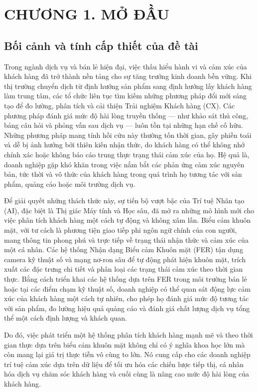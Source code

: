 \section*{CHƯƠNG 1. MỞ ĐẦU}
\setcounter{section}{1}
\setcounter{subsection}{0}
\setcounter{figure}{0}
\setcounter{table}{0}

\subsection{Bối cảnh và tính cấp thiết của đề tài}
Trong ngành dịch vụ và bán lẻ hiện đại, việc thấu hiểu hành vi và cảm xúc của khách hàng đã trở thành nền tảng cho sự tăng trưởng kinh doanh bền vững. Khi thị trường chuyển dịch từ định hướng sản phẩm sang định hướng lấy khách hàng làm trung tâm, các tổ chức liên tục tìm kiếm những phương pháp đổi mới sáng tạo để đo lường, phân tích và cải thiện Trải nghiệm Khách hàng (CX). Các phương pháp đánh giá mức độ hài lòng truyền thống — như khảo sát thủ công, bảng câu hỏi và phỏng vấn sau dịch vụ — luôn tồn tại những hạn chế cố hữu. Những phương pháp mang tính hồi cứu này thường tốn thời gian, gây phiền toái và dễ bị ảnh hưởng bởi thiên kiến nhận thức, do khách hàng có thể không nhớ chính xác hoặc không báo cáo trung thực trạng thái cảm xúc của họ. Hệ quả là, doanh nghiệp gặp khó khăn trong việc nắm bắt các phản ứng cảm xúc nguyên bản, tức thời và vô thức của khách hàng trong quá trình họ tương tác với sản phẩm, quảng cáo hoặc môi trường dịch vụ.

Để giải quyết những thách thức này, sự tiến bộ vượt bậc của Trí tuệ Nhân tạo (AI), đặc biệt là Thị giác Máy tính và Học sâu, đã mở ra những mô hình mới cho việc phân tích khách hàng một cách tự động và không xâm lấn. Biểu cảm khuôn mặt, với tư cách là phương tiện giao tiếp phi ngôn ngữ chính của con người, mang thông tin phong phú và trực tiếp về trạng thái nhận thức và cảm xúc của một cá nhân. Các hệ thống Nhận dạng Biểu cảm Khuôn mặt (FER) tận dụng camera kỹ thuật số và mạng nơ-ron sâu để tự động phát hiện khuôn mặt, trích xuất các đặc trưng chi tiết và phân loại các trạng thái cảm xúc theo thời gian thực. Bằng cách triển khai các hệ thống dựa trên FER trong môi trường bán lẻ hoặc tại các điểm chạm kỹ thuật số, doanh nghiệp có thể quan sát động lực cảm xúc của khách hàng một cách tự nhiên, cho phép họ đánh giá mức độ tương tác với sản phẩm, đo lường hiệu quả quảng cáo và đánh giá chất lượng dịch vụ tổng thể một cách định lượng và khách quan.

Do đó, việc phát triển một hệ thống phân tích khách hàng mạnh mẽ và theo thời gian thực dựa trên biểu cảm khuôn mặt không chỉ có ý nghĩa khoa học lớn mà còn mang lại giá trị thực tiễn vô cùng to lớn. Nó cung cấp cho các doanh nghiệp trí tuệ cảm xúc dựa trên dữ liệu để tối ưu hóa các chiến lược tiếp thị, cá nhân hóa dịch vụ chăm sóc khách hàng và cuối cùng là nâng cao mức độ hài lòng của khách hàng.

